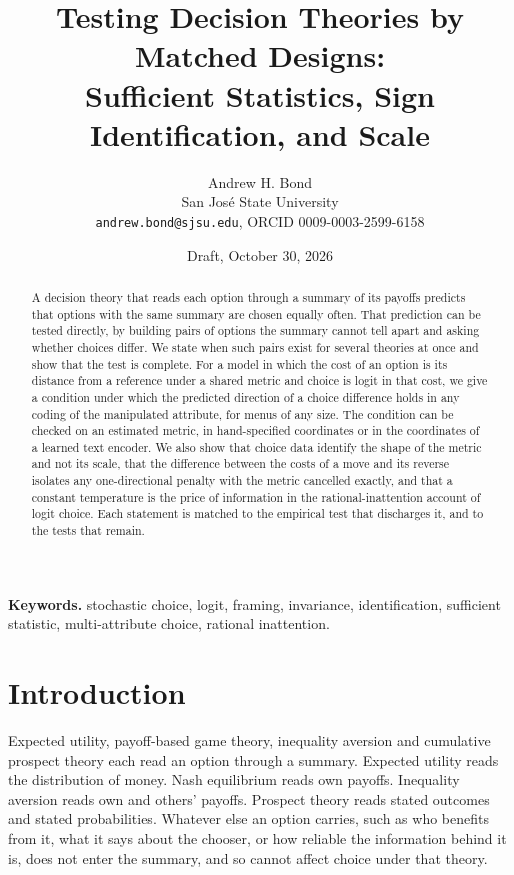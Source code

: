 \documentclass[11pt]{article}
\title{Testing Decision Theories by Matched Designs:\\Sufficient Statistics, Sign Identification, and Scale}
\author{Andrew H. Bond\\San Jos\'e State University\\\small\texttt{andrew.bond@sjsu.edu}, ORCID 0009-0003-2599-6158}
\date{Draft, October 30, 2026}
\theoremstyle{definition}
\begin{document}
\maketitle

\begin{abstract}
A decision theory that reads each option through a summary of its payoffs predicts that options with the same summary are chosen equally often.
That prediction can be tested directly, by building pairs of options the summary cannot tell apart and asking whether choices differ.
We state when such pairs exist for several theories at once and show that the test is complete.
For a model in which the cost of an option is its distance from a reference under a shared metric and choice is logit in that cost, we give a condition under which the predicted direction of a choice difference holds in any coding of the manipulated attribute, for menus of any size.
The condition can be checked on an estimated metric, in hand-specified coordinates or in the coordinates of a learned text encoder.
We also show that choice data identify the shape of the metric and not its scale, that the difference between the costs of a move and its reverse isolates any one-directional penalty with the metric cancelled exactly, and that a constant temperature is the price of information in the rational-inattention account of logit choice.
Each statement is matched to the empirical test that discharges it, and to the tests that remain.
\end{abstract}

\noindent\textbf{Keywords.} stochastic choice, logit, framing, invariance, identification, sufficient statistic, multi-attribute choice, rational inattention.

\section{Introduction}

Expected utility, payoff-based game theory, inequality aversion and cumulative prospect theory each read an option through a summary.
Expected utility reads the distribution of money.
Nash equilibrium reads own payoffs.
Inequality aversion reads own and others' payoffs.
Prospect theory reads stated outcomes and stated probabilities.
Whatever else an option carries, such as who benefits from it, what it says about the chooser, or how reliable the information behind it is, does not enter the summary, and so cannot affect choice under that theory.
\end{document}
